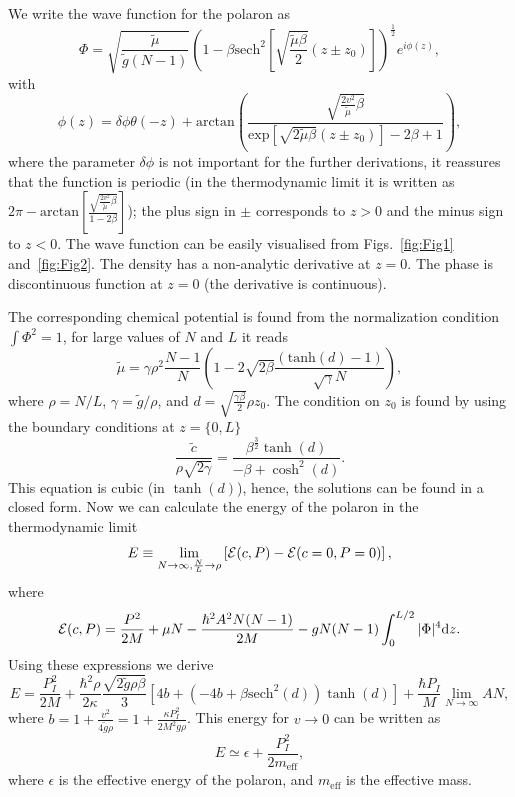 \documentclass[twocolumn,amsmath,amssymb,showpacs,prl,superscriptaddress,aps]{revtex4-1}
\begin{document}
We write the wave function for the polaron as
\begin{equation}
\Phi=\sqrt{\frac{\tilde \mu}{\tilde g(N-1)}}\left(1-\beta \mathrm{sech}^2\left[\sqrt{\frac{\tilde\mu\beta}{2}}(z\pm z_0)\right]\right)^{\frac{1}{2}}e^{i\phi(z)},
\end{equation}
with 
\begin{equation}
\phi(z)=\delta \phi \theta(-z)+\mathrm{arctan}\left(\frac{\sqrt{\frac{2 v^2}{\tilde \mu}\beta}}{\mathrm{exp}\left[\sqrt{2\tilde \mu\beta}(z\pm z_0)\right]-2\beta+1}\right),
\end{equation}
where the parameter $\delta \phi$ is not important for the further derivations, it reassures that the function is periodic  
(in the thermodynamic limit it is written as $2\pi - \mathrm{arctan}\left[\frac{\sqrt{\frac{2 v^2}{\tilde \mu}\beta}}{1-2\beta}\right]$);
the plus sign in $\pm$ corresponds to $z>0$ and the minus sign to $z<0$. The wave function can be easily visualised from Figs.~\ref{fig:Fig1} and~\ref{fig:Fig2}. 
The density has a non-analytic derivative at $z=0$. The phase is discontinuous function at $z=0$ (the derivative is continuous).



The corresponding chemical potential is found from the normalization condition $\int \Phi^2=1$, for large values of $N$ and $L$ it reads
\begin{equation}
\tilde \mu=\gamma \rho^2 \frac{N-1}{N}\left(1-2\sqrt{2\beta} \frac{ (\mathrm{tanh}(d)-1)}{\sqrt{\gamma}N}\right),
\end{equation}
where $\rho=N/L$, $\gamma=\tilde g/\rho$, and $d=\sqrt{\frac{\gamma \beta}{2}}\rho z_0$.
The condition on $z_0$ is found by using the boundary conditions at $z=\{0,L\}$
\begin{equation}
\frac{\tilde c}{\rho \sqrt{2\gamma}}=\frac{\beta^{\frac{3}{2}}\tanh(d)}{-\beta+\cosh^2(d)}.
\end{equation}
This equation is cubic (in $\tanh(d)$), hence, the solutions can be found in a closed form.
Now we can calculate the energy of the polaron in the thermodynamic limit
\begin{equation}
E\equiv \lim_{N\to\infty, \frac{N}{L}\to \rho}\left[{\cal E}(c,P)-{\cal E}(c=0,P=0)\right],
\end{equation}
where
\begin{equation}
{\cal E}(c,P) = \frac{P^2}{2M} + \mu N-\frac{\hbar^2 A^2 N(N-1)}{2M}-gN(N-1)\int_{0}^{L/2}|\Phi|^4\mathrm{d}z.
\end{equation}
Using these expressions we derive 
\begin{equation}
E=\frac{P_I^2}{2M}+\frac{\hbar^2\rho}{2\kappa}\frac{\sqrt{2 \tilde g \rho \beta}}{3}\left[4 b + (-4b+\beta\mathrm{sech}^2(d))\tanh(d)\right]+\frac{\hbar P_I}{M}\lim_{N\to\infty} A N,
\end{equation}
where $b=1+\frac{v^2}{4\tilde g\rho}=1+\frac{\kappa P_I^2}{2M^2 g\rho}$. This energy for $v\to 0$ can be written as 
\begin{equation}
E\simeq \epsilon+ \frac{P_I^2}{2m_{\mathrm{\mathrm{eff}}}},
\end{equation}
where $\epsilon$ is the effective energy of the polaron, and $m_{\mathrm{eff}}$ is the effective mass.
\end{document}
